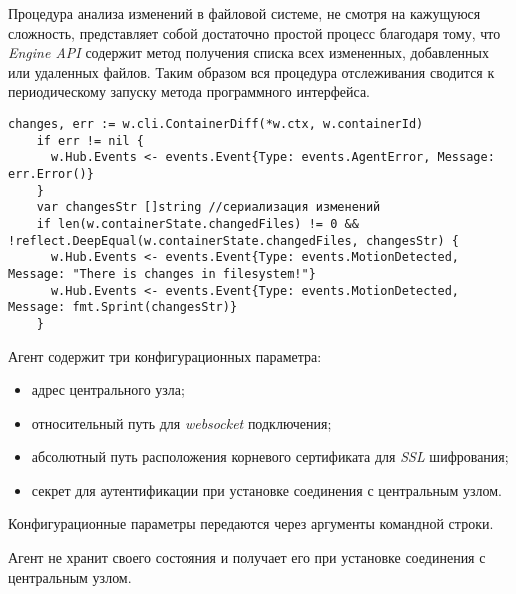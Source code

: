 Процедура анализа изменений в файловой системе, не смотря на кажущуюся сложность, представляет собой достаточно простой процесс благодаря тому, что \textit{Engine API} содержит метод получения списка всех измененных, добавленных или удаленных файлов. Таким образом вся процедура отслеживания сводится к периодическому запуску метода программного интерфейса.

\begin{lstlisting}[style=gostyle]
	changes, err := w.cli.ContainerDiff(*w.ctx, w.containerId)
	if err != nil {
	  w.Hub.Events <- events.Event{Type: events.AgentError, Message: err.Error()}
	}
	var changesStr []string //сериализация изменений
	if len(w.containerState.changedFiles) != 0 && !reflect.DeepEqual(w.containerState.changedFiles, changesStr) {
	  w.Hub.Events <- events.Event{Type: events.MotionDetected, Message: "There is changes in filesystem!"}
	  w.Hub.Events <- events.Event{Type: events.MotionDetected, Message: fmt.Sprint(changesStr)}
	}
\end{lstlisting}

Агент содержит три конфигурационных параметра:
\begin{itemize}
	\item адрес центрального узла;
	\item относительный путь для \textit{websocket} подключения;
	\item абсолютный путь расположения корневого сертификата для \textit{SSL} шифрования;
	\item секрет для аутентификации при установке соединения с центральным узлом.
\end{itemize}

Конфигурационные параметры передаются через аргументы командной строки.

Агент не хранит своего состояния и получает его при установке соединения с центральным узлом.